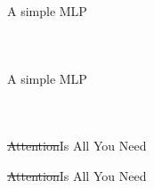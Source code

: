 \begin{frame}{A simple MLP}
  \begin{columns}
    \begin{column}{0.26\textwidth}
      \begin{figure}
        \centering
        \begin{adjustbox}{height=0.48\textheight, center}
          
        \end{adjustbox}
      \end{figure}
    \end{column}
    \begin{column}{0.74\textwidth}
      \inputminted[]{TeX}{img/tutorial/mlp/mlp_step_2.tex}
    \end{column}
  \end{columns}
\end{frame}

\begin{frame}{A simple MLP}
  \begin{columns}
    \begin{column}{0.26\textwidth}
      \begin{figure}
        \centering
        \begin{adjustbox}{width=0.98\textwidth, center}
          
        \end{adjustbox}
      \end{figure}
    \end{column}
    \begin{column}{0.74\textwidth}
      \inputminted[]{TeX}{img/tutorial/mlp/mlp.tex}
    \end{column}
  \end{columns}
\end{frame}

\begin{frame}{\sout{Attention}\TikZ Is All You Need}
  \begin{figure}
    \centering
    \resizebox{!}{0.9\textheight}{%
      
    }
  \end{figure}
\end{frame}

\begin{frame}{\sout{Attention}\TikZ Is All You Need}
\begin{columns}
  \begin{column}{0.4\textwidth}
    \begin{figure}
      \centering
      \resizebox{!}{0.9\textheight}{%
        
      }
    \end{figure}
  \end{column}
  \begin{column}{0.7\textwidth}
    \inputminted[]{TeX}{img/tutorial/transformers/transformers_step_1.tex}
  \end{column}
\end{columns}
\end{frame}

